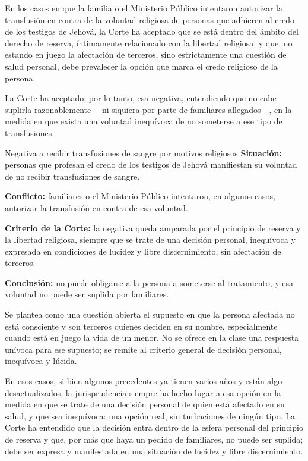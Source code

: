 \documentclass[12pt,oneside]{book}
\begin{document}
En los casos en que la familia o el Ministerio Público intentaron autorizar la transfusión en contra de la voluntad religiosa de personas que adhieren al credo de los testigos de Jehová, la Corte ha aceptado que se está dentro del ámbito del derecho de reserva, íntimamente relacionado con la libertad religiosa, y que, no estando en juego la afectación de terceros, sino estrictamente una cuestión de salud personal, debe prevalecer la opción que marca el credo religioso de la persona.

La Corte ha aceptado, por lo tanto, esa negativa, entendiendo que no cabe suplirla razonablemente —ni siquiera por parte de familiares allegados—, en la medida en que exista una voluntad inequívoca de no someterse a ese tipo de transfusiones.

\begin{example}{Negativa a recibir transfusiones de sangre por motivos religiosos}
\textbf{Situación:} personas que profesan el credo de los testigos de Jehová manifiestan su voluntad de no recibir transfusiones de sangre.

\textbf{Conflicto:} familiares o el Ministerio Público intentaron, en algunos casos, autorizar la transfusión en contra de esa voluntad.

\textbf{Criterio de la Corte:} la negativa queda amparada por el principio de reserva y la libertad religiosa, siempre que se trate de una decisión personal, inequívoca y expresada en condiciones de lucidez y libre discernimiento, sin afectación de terceros.

\textbf{Conclusión:} no puede obligarse a la persona a someterse al tratamiento, y esa voluntad no puede ser suplida por familiares.
\end{example}

\begin{important}
Se plantea como una cuestión abierta el supuesto en que la persona afectada no está consciente y son terceros quienes deciden en su nombre, especialmente cuando está en juego la vida de un menor. No se ofrece en la clase una respuesta unívoca para ese supuesto; se remite al criterio general de decisión personal, inequívoca y lúcida.
\end{important}

En esos casos, si bien algunos precedentes ya tienen varios años y están algo desactualizados, la jurisprudencia siempre ha hecho lugar a esa opción en la medida en que se trate de una decisión personal de quien está afectado en su salud, y que sea inequívoca: una opción real, sin turbaciones de ningún tipo. La Corte ha entendido que la decisión entra dentro de la esfera personal del principio de reserva y que, por más que haya un pedido de familiares, no puede ser suplida; debe ser expresa y manifestada en una situación de lucidez y libre discernimiento.
\end{document}
